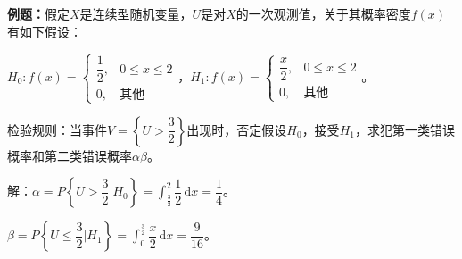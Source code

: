 \documentclass[UTF8, 12pt]{ctexart}
\begin{document}
\textbf{例题：}假定$X$是连续型随机变量，$U$是对$X$的一次观测值，关于其概率密度$f(x)$有如下假设：

$H_0:f(x)=\left\{\begin{array}{ll}
    \dfrac{1}{2}, & 0\leqslant x\leqslant2 \\
    0, & \text{其他}
\end{array}\right.$，$H_1:f(x)=\left\{\begin{array}{ll}
    \dfrac{x}{2}, & 0\leqslant x\leqslant2 \\
    0, & \text{其他}
\end{array}\right.$。

检验规则：当事件$V=\left\{U>\dfrac{3}{2}\right\}$出现时，否定假设$H_0$，接受$H_1$，求犯第一类错误概率和第二类错误概率$\alpha\beta$。

解：$\alpha=P\left\{U>\dfrac{3}{2}\bigg|H_0\right\}=\displaystyle{\int_\frac{3}{2}^2\dfrac{1}{2}\,\textrm{d}x=\dfrac{1}{4}}$。

$\beta=P\left\{U\leqslant\dfrac{3}{2}\bigg|H_1\right\}=\displaystyle{\int_0^{\frac{3}{2}}\dfrac{x}{2}\,\textrm{d}x=\dfrac{9}{16}}$。
\end{document}

